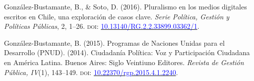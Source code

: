 \begin{publications}
\begin{benumerate}{4}
\item{\small González-Bustamante, B., \& Soto, D. (2016). Pluralismo en los medios digitales escritos en Chile, una exploración de casos clave. {\itshape Serie Política, Gestión y Políticas Públicas}, 2, 1--26. {\scshape doi:} \href{http://doi.org/10.13140/RG.2.2.33899.03362/1}{\textcolor{blue}{10.13140/RG.2.2.33899.03362/1}}.}\vspace{1mm}


\item{\small González-Bustamante, B. (2015). Programas de Naciones Unidas para el Desarrollo (PNUD). (2014). Ciudadanía Política: Voz y Participación Ciudadana en América Latina. Buenos Aires: Siglo Veintiuno Editores. {\itshape Revista de Gestión Pública, IV}(1), 143--149. {\scshape doi:} \href{https://doi.org/10.22370/rgp.2015.4.1.2240}{\textcolor{blue}{10.22370/rgp.2015.4.1.2240}}.}

\end{benumerate}

\end{publications}
